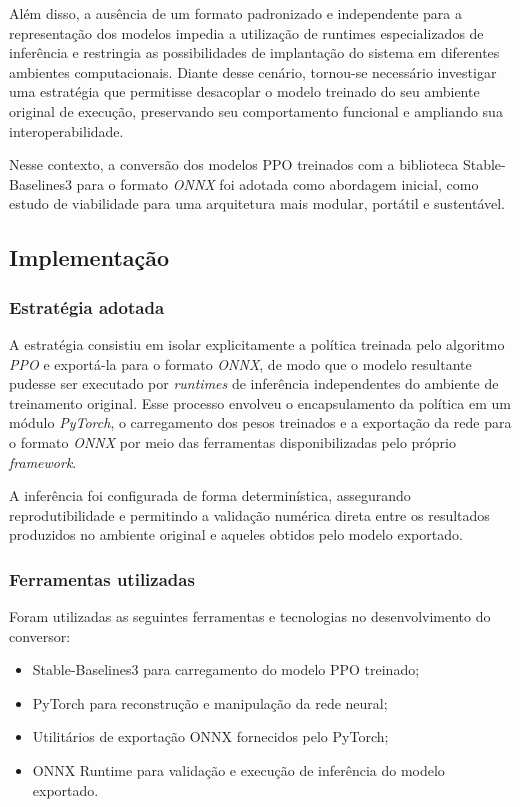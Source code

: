 Além disso, a ausência de um formato padronizado e independente para a representação dos modelos impedia a utilização de runtimes especializados de inferência e restringia as possibilidades de implantação do sistema em diferentes ambientes computacionais. Diante desse cenário, tornou-se necessário investigar uma estratégia que permitisse desacoplar o modelo treinado do seu ambiente original de execução, preservando seu comportamento funcional e ampliando sua interoperabilidade.

Nesse contexto, a conversão dos modelos PPO treinados com a biblioteca Stable-Baselines3 para o formato \emph{ONNX} foi adotada como abordagem inicial, como estudo de viabilidade para uma arquitetura mais modular, portátil e sustentável.

\subsection{Implementação}

\subsubsection{Estratégia adotada}

A estratégia consistiu em isolar explicitamente a política treinada pelo algoritmo \emph{PPO} e exportá-la para o formato \emph{ONNX}, de modo que o modelo resultante pudesse ser executado por \emph{runtimes} de inferência independentes do ambiente de treinamento original. Esse processo envolveu o encapsulamento da política em um módulo \emph{PyTorch}, o carregamento dos pesos treinados e a exportação da rede para o formato \emph{ONNX} por meio das ferramentas disponibilizadas pelo próprio \emph{framework}.

A inferência foi configurada de forma determinística, assegurando reprodutibilidade e permitindo a validação numérica direta entre os resultados produzidos no ambiente original e aqueles obtidos pelo modelo exportado.

\subsubsection{Ferramentas utilizadas}

Foram utilizadas as seguintes ferramentas e tecnologias no desenvolvimento do conversor:

\begin{itemize}
    \item Stable-Baselines3 para carregamento do modelo PPO treinado;
    \item PyTorch para reconstrução e manipulação da rede neural;
    \item Utilitários de exportação ONNX fornecidos pelo PyTorch;
    \item ONNX Runtime para validação e execução de inferência do modelo exportado.
\end{itemize}

